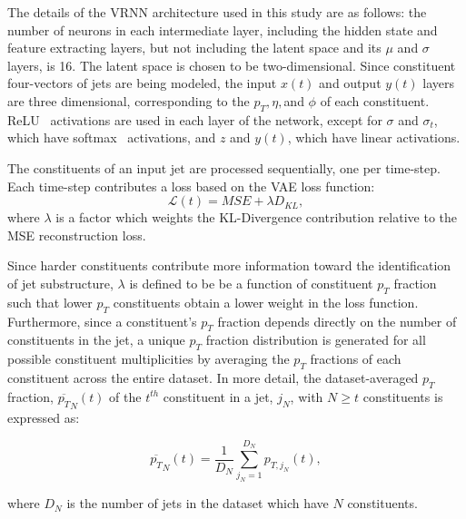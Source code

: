 \documentclass[12pt, a4paper]{article}
\begin{document}

The details of the VRNN architecture used in this study are as follows: the number of neurons in each intermediate layer, including the hidden state and feature extracting layers, but not including the latent space and its $\mu$ and $\sigma$ layers, is 16. The latent space is chosen to be two-dimensional. Since constituent four-vectors of jets are being modeled, the input $x(t)$ and output $y(t)$ layers are three dimensional, corresponding to the $p_{T}, \eta, $and $\phi$ of each constituent. ReLU~\cite{activations} activations are used in each layer of the network, except for $\sigma$ and $\sigma_{t}$, which have softmax~\cite{activations} activations, and $z$ and $y(t)$, which have linear activations. 

The constituents of an input jet are processed sequentially, one per time-step. 
Each time-step contributes a loss based on the VAE loss function: 
\begin{equation}
\mathcal{L}(t) = MSE + \lambda D_{KL},
\end{equation}
where $\lambda$ is a factor which weights the KL-Divergence contribution relative to the MSE reconstruction loss.

Since harder constituents contribute more information toward the identification of jet substructure, $\lambda$ is defined to be be a function of constituent $p_{T}$ fraction such that lower $p_{T}$ constituents obtain a lower weight in the loss function. 
Furthermore, since a constituent's $p_{T}$ fraction depends directly on the number of constituents in the jet, a unique $p_{T}$ fraction distribution is generated for all possible constituent multiplicities by averaging the $p_{T}$ fractions of each constituent across the entire dataset. In more detail, the dataset-averaged $p_{T}$ fraction, $\overline{p_{T}}_{N}(t)$ of the $t^{th}$ constituent in a jet, $j_{N}$, with $N \geq t$ constituents is expressed as:


\begin{equation}
\overline{p_{T}}_{N}(t)=\frac{1}{D_{N}}\displaystyle\sum_{j_{N} = 1}^{D_{N}} p_{T,j_{N}}(t),
\end{equation}

where $D_{N}$ is the number of jets in the dataset which have $N$ constituents.
\end{document}
